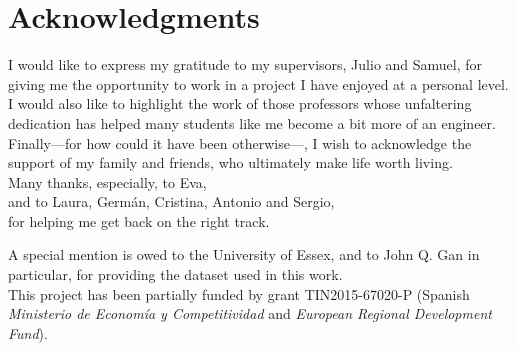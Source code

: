 
\begingroup
\chapter*{Acknowledgments}

I would like to express my gratitude to my supervisors, Julio and Samuel, for giving me the opportunity to work in a project I have enjoyed at a personal level. \\

\noindent
I would also like to highlight the work of those professors whose unfaltering dedication has helped many students like me become a bit more of an engineer. \\

\noindent
Finally---for how could it have been otherwise---, I wish to acknowledge the support of my family and friends, who ultimately make life worth living. \\

\noindent
Many thanks, especially, to Eva, \\
and to Laura, Germán, Cristina, Antonio and Sergio, \\
for helping me get back on the right track.

\vfill

\noindent
A special mention is owed to the University of Essex, and to John Q. Gan in particular, for providing the dataset used in this work. \\

\noindent
This project has been partially funded by grant TIN2015-67020-P (Spanish \textit{Ministerio de Economía y Competitividad} and \textit{European Regional Development Fund}).

\endgroup
